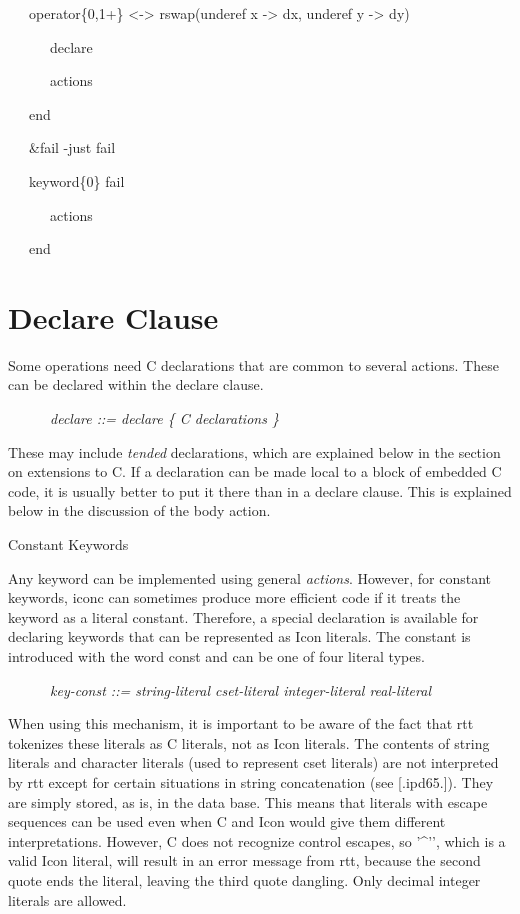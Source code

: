 {\ttfamily\mdseries
\ \ \ operator\{0,1+\} {\textless}-{\textgreater} rswap(underef x -{\textgreater} dx, underef y -{\textgreater} dy)}

{\ttfamily\mdseries
\ \ \ \ \ \ declare}

{\ttfamily\mdseries
\ \ \ \ \ \ actions}

{\ttfamily\mdseries
\ \ \ end}


\bigskip

{\ttfamily\mdseries
\ \ \ \&fail -just fail}

{\ttfamily\mdseries
\ \ \ keyword\{0\} fail}

{\ttfamily\mdseries
\ \ \ \ \ \ actions}

{\ttfamily\mdseries
\ \ \ end}


\section{Declare Clause}

Some operations need C declarations that are common to several
actions. These can be declared within the declare clause.


{\ttfamily\mdseries
\ \ \ \ \ \ \textit{declare ::= declare \{ C declarations \}}}


These may include \textit{tended} declarations, which are explained
below in the section on extensions to C. If a declaration can be made
local to a block of embedded C code, it is usually better to put it
there than in a declare clause. This is explained below in the
discussion of the body action.

{\sffamily
Constant Keywords}

Any keyword can be implemented using general
\textit{actions}. However, for constant keywords, iconc can sometimes
produce more efficient code if it treats the keyword as a literal
constant. Therefore, a special declaration is available for declaring
keywords that can be represented as Icon literals. The constant is
introduced with the word const and can be one of four literal types.

{\ttfamily\mdseries
\ \ \ \ \ \ \textit{key-const ::= string-literal {\textbar} cset-literal {\textbar} integer-literal {\textbar}
real-literal}}


When using this mechanism, it is important to be aware of the fact
that rtt tokenizes these literals as C literals, not as Icon
literals. The contents of string literals and character literals (used
to represent cset literals) are not interpreted by rtt except for
certain situations in string concatenation (see [.ipd65.]). They are
simply stored, as is, in the data base. This means that literals with
escape sequences can be used even when C and Icon would give them
different interpretations. However, C does not recognize control
escapes, so '\^{}'{}', which is a valid Icon literal, will result in
an error message from rtt, because the second quote ends the literal,
leaving the third quote dangling.  Only decimal integer literals are
allowed.


